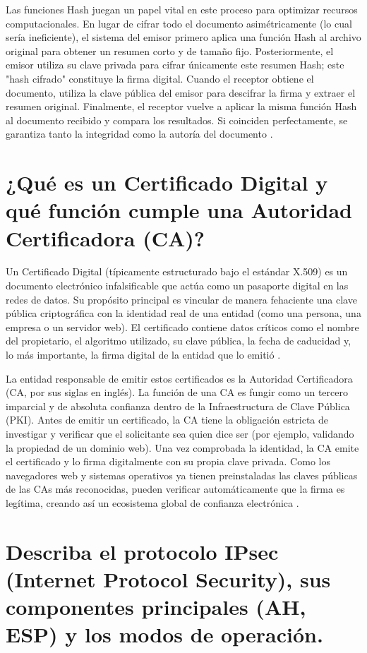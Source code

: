 \documentclass[a4paper,12pt]{article}
\begin{document}
Las funciones Hash juegan un papel vital en este proceso para optimizar recursos computacionales. En lugar de cifrar todo el documento asimétricamente (lo cual sería ineficiente), el sistema del emisor primero aplica una función Hash al archivo original para obtener un resumen corto y de tamaño fijo. Posteriormente, el emisor utiliza su clave privada para cifrar únicamente este resumen Hash; este "hash cifrado" constituye la firma digital. Cuando el receptor obtiene el documento, utiliza la clave pública del emisor para descifrar la firma y extraer el resumen original. Finalmente, el receptor vuelve a aplicar la misma función Hash al documento recibido y compara los resultados. Si coinciden perfectamente, se garantiza tanto la integridad como la autoría del documento \cite{kurose2017}.

\section{¿Qué es un Certificado Digital y qué función cumple una Autoridad Certificadora (CA)?}

Un Certificado Digital (típicamente estructurado bajo el estándar X.509) es un documento electrónico infalsificable que actúa como un pasaporte digital en las redes de datos. Su propósito principal es vincular de manera fehaciente una clave pública criptográfica con la identidad real de una entidad (como una persona, una empresa o un servidor web). El certificado contiene datos críticos como el nombre del propietario, el algoritmo utilizado, su clave pública, la fecha de caducidad y, lo más importante, la firma digital de la entidad que lo emitió \cite{forouzan2015}.

La entidad responsable de emitir estos certificados es la Autoridad Certificadora (CA, por sus siglas en inglés). La función de una CA es fungir como un tercero imparcial y de absoluta confianza dentro de la Infraestructura de Clave Pública (PKI). Antes de emitir un certificado, la CA tiene la obligación estricta de investigar y verificar que el solicitante sea quien dice ser (por ejemplo, validando la propiedad de un dominio web). Una vez comprobada la identidad, la CA emite el certificado y lo firma digitalmente con su propia clave privada. Como los navegadores web y sistemas operativos ya tienen preinstaladas las claves públicas de las CAs más reconocidas, pueden verificar automáticamente que la firma es legítima, creando así un ecosistema global de confianza electrónica \cite{kurose2017}.

\section{Describa el protocolo IPsec (Internet Protocol Security), sus componentes principales (AH, ESP) y los modos de operación.}
\end{document}
